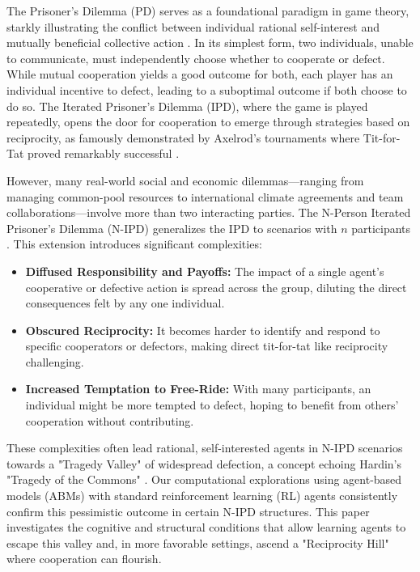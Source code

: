 \documentclass[]{llncs} %
\begin{document}
The Prisoner's Dilemma (PD) serves as a foundational paradigm in game theory, starkly illustrating the conflict between individual rational self-interest and mutually beneficial collective action \cite{Axelrod}. 
In its simplest form, two individuals, unable to communicate, must independently choose whether to cooperate or defect. While mutual cooperation yields a good outcome for both, each player has an individual incentive to defect, leading to a suboptimal outcome if both choose to do so. The Iterated Prisoner's Dilemma (IPD), where the game is played repeatedly, opens the door for cooperation to emerge through strategies based on reciprocity, as famously demonstrated by Axelrod's tournaments where Tit-for-Tat proved remarkably successful \cite{Axelrod}. 

However, many real-world social and economic dilemmas—ranging from managing common-pool resources to international climate agreements and team collaborations—involve more than two interacting parties. The N-Person Iterated Prisoner's Dilemma (N-IPD) generalizes the IPD to scenarios with $n$ participants \cite{Hamburger1973, Hardin1971}. 
This extension introduces significant complexities:
\begin{itemize}
    \item \textbf{Diffused Responsibility and Payoffs:} The impact of a single agent's cooperative or defective action is spread across the group, diluting the direct consequences felt by any one individual.
    \item \textbf{Obscured Reciprocity:} It becomes harder to identify and respond to specific cooperators or defectors, making direct tit-for-tat like reciprocity challenging.
    \item \textbf{Increased Temptation to Free-Ride:} With many participants, an individual might be more tempted to defect, hoping to benefit from others' cooperation without contributing.
\end{itemize}

These complexities often lead rational, self-interested agents in N-IPD scenarios towards a "Tragedy Valley" of widespread defection, a concept echoing Hardin's "Tragedy of the Commons" \cite{Hardin1968}. 
Our computational explorations using agent-based models (ABMs) with standard reinforcement learning (RL) agents consistently confirm this pessimistic outcome in certain N-IPD structures. This paper investigates the cognitive and structural conditions that allow learning agents to escape this valley and, in more favorable settings, ascend a "Reciprocity Hill" where cooperation can flourish.
\end{document}
